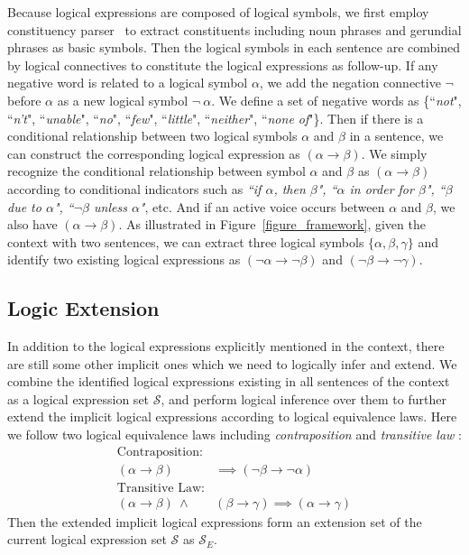 \documentclass[11pt,a4paper]{article}
\begin{document}
Because logical expressions are composed of logical symbols, we first employ constituency parser~\cite{joshi2018extending} to extract constituents including noun phrases and gerundial phrases as basic symbols.
Then the logical symbols in each sentence are combined by logical connectives to constitute the logical expressions as follow-up. If any negative word is related to a logical symbol $\alpha$, we add the negation connective $\neg$ before $\alpha$ as a new logical symbol $\neg \ \alpha$.
We define a set of negative words as \{``\emph{not}", ``\emph{n't}", ``\emph{unable}", ``\emph{no}", ``\emph{few}", ``\emph{little}", ``\emph{neither}", ``\emph{none of}"\}.
Then if there is a conditional relationship between two logical symbols $\alpha$ and $\beta$ in a sentence, we can construct the corresponding logical expression as $(\alpha \rightarrow \beta)$.
We simply recognize the conditional relationship between symbol $\alpha$ and $\beta$ as $(\alpha \rightarrow \beta)$ according to conditional indicators such as \emph{``if $\alpha$, then $\beta$", ``$\alpha$ in order for $\beta$", ``$\beta$ due to $\alpha$", ``$\neg \beta$ unless $\alpha$"}, etc.
And if an active voice occurs between $\alpha$ and $\beta$, we also have $(\alpha \rightarrow \beta)$. As illustrated in Figure~\ref{figure_framework}, given the context with two sentences, we can extract three logical symbols $\{\alpha, \beta, \gamma\}$ and identify two existing logical expressions as $(\neg \alpha \rightarrow \neg \beta)$ and $(\neg \beta \rightarrow \neg \gamma)$.



\subsection{Logic Extension}
\label{sec:extension_step}
In addition to the logical expressions explicitly mentioned in the context, there are still some other implicit ones which we need to logically infer and extend.
We combine the identified logical expressions existing in all sentences of the context as a logical expression set $\mathcal{S}$, and perform logical inference over them to further extend the implicit logical expressions according to logical equivalence laws. Here we follow two logical equivalence laws including \emph{contraposition} \cite{russel2013artificial} and \emph{transitive law} \cite{zhao1997static}:
\begin{align}
    \text{Contraposition}: & \nonumber \\
    (\alpha \rightarrow \beta) & \implies (\neg \beta \rightarrow \neg \alpha)  \\
    \text{Transitive Law}: & \nonumber \\
    (\alpha \rightarrow \beta) \ \land \ & (\beta \rightarrow \gamma) \implies (\alpha \rightarrow \gamma)  
\end{align}
Then the extended implicit logical expressions form an extension set of the current logical expression set $\mathcal{S}$ as $\mathcal{S}_E$.
\end{document}
